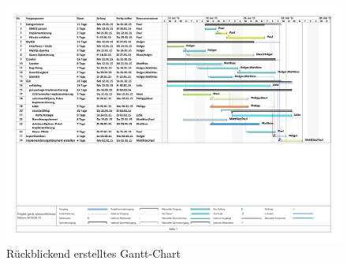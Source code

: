 \begin{figure}[H]
	\centering
	\includegraphics[width=\textwidth]{../Gantt/gantt_neu.pdf}
	\caption{Rückblickend erstelltes Gantt-Chart}
\end{figure}
